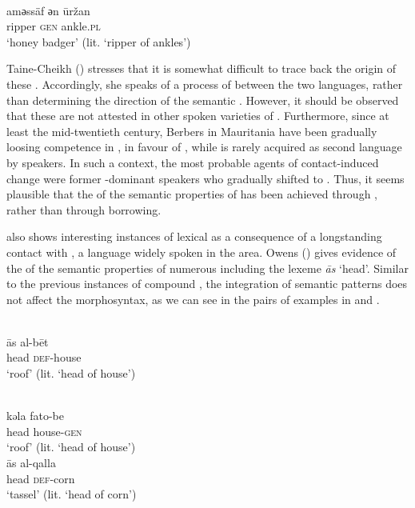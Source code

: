 \documentclass[output=paper]{langsci/langscibook}
\begin{document}
\\
\gll   amәssäf әn ūržan \\
       ripper \textsc{gen} ankle.\textsc{pl} \\
\glt   `honey badger' (lit. ‘ripper of ankles’)
\z
\z

Taine-Cheikh (\citeyear[126]{Taine-Cheikh2008chapter}) stresses that it is somewhat difficult to trace back the origin of these . Accordingly, she speaks of a process of  between the two languages, rather than determining the direction of the semantic . However, it should be observed that these  are not attested in other spoken varieties of . Furthermore, since at least the mid-twentieth century, Berbers in Mauritania have been gradually loosing competence in , in favour of  \citep[100]{Taine-Cheikh2012}, while  is rarely acquired as second language by   speakers. In such a context, the most probable agents of contact-induced change were former -dominant speakers who gradually shifted to . Thus, it seems plausible that the  of the semantic properties of   has been achieved through , rather than through borrowing.

  also shows interesting instances of lexical  as a consequence of a longstanding contact with , a  language widely spoken in the  area. Owens (\citeyear{Owens2015,Owens2016idioms}) gives evidence of the  of the semantic properties of numerous  including the lexeme \textit{{\R}ās} ‘head’. Similar to the previous instances of compound , the integration of  semantic patterns does not affect the  morphosyntax, as we can see in the  pairs of examples in  and . 

\ea\label{ex:roof}
\\
\gll   {\R}ās al-bēt \\
       head \textsc{def}-house\\
\glt   `roof' (lit. ‘head of house’)

\\
\gll   kǝla fato-be   \\
       head house-\textsc{gen}\\
\glt   `roof' (lit. ‘head of house’)
\z\pagebreak\largerpage
\ex\label{ex:tassel}
\\
\gll   {\R}ās al-qalla  \\
       head \textsc{def}-corn\\
\glt   `tassel' (lit. ‘head of corn')
\end{document}

